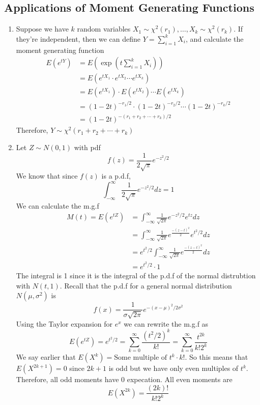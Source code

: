 \subsection{Applications of Moment Generating Functions}
\begin{enumerate}
    \item Suppose we have $k$ random variables $X_1 \sim \chi^2(r_1), \ldots, X_k \sim \chi^2(r_k)$.  If they're independent, then we can define $Y = \sum\limits_{i=1}^k X_i$, and calculate the moment generating function 
    \begin{align*}
        E(e^{tY}) &= E\left(\exp\left(t\sum_{i=1}^k X_i\right)\right)\\
        &= E(e^{tX_1} \cdot e^{tX_2} \cdots e^{tX_k})\\
        &= E(e^{tX_1}) \cdot E(e^{tX_2}) \cdots E(e^{tX_k})\\
        &= (1-2t)^{-r_1/2} \cdot (1-2t)^{-r_2/2} \cdots (1-2t)^{-r_k/2}\\
        &= (1-2t)^{-(r_1 + r_2 + \cdots + r_k)/2}
    \end{align*}
    Therefore, $Y \sim \chi^2(r_1 + r_2 + \cdots + r_k)$
    \item Let $Z \sim N(0,1)$ with pdf 
    \[f(z) = \frac{1}{2\sqrt{\pi}}e^{-z^2/2}\]
    We know that since $f(z)$ is a p.d.f,
    \[\int_{-\infty}^\infty \frac{1}{2\sqrt{\pi}}e^{-z^2/2}dz = 1\]
    We can calculate the m.g.f 
    \begin{align*}
        M(t) = E(e^{tZ}) &= \int_{-\infty}^\infty \frac{1}{\sqrt{2\pi}}e^{-z^2/2}e^{tz}dz\\
        &= \int_{-\infty}^\infty \frac{1}{\sqrt{2\pi}}e^{\frac{-(z-t)^2}{2}}e^{t^2/2}dz\\
        &= e^{t^2/2}\int_{-\infty}^\infty \frac{1}{\sqrt{2\pi}}e^{\frac{-(z-t)^2}{2}}dz\\
        &= e^{t^2/2} \cdot 1
    \end{align*} 
    The integral is 1 since it is the integral of the p.d.f of the normal distrubtion with $N(t, 1)$. Recall that the p.d.f for a general normal distribution $N(\mu, \sigma^2)$ is 
    \[f(x) = \frac{1}{\sigma\sqrt{2\pi}}e^{-(x-\mu)^2/2\sigma^2}\]
    Using the Taylor expansion for $e^x$ we can rewrite the m.g.f as 
    \[E(e^{tZ}) = e^{t^2/2} = \sum_{k=0}^\infty \frac{(t^2/2)^k}{k!} = \sum_{k=0}^\infty \frac{t^{2k}}{k!2^k}\]
    We say earlier that $E(X^k) = \text{Some multiple of $t^k$} \cdot k!$. So this means that $E(X^{2k+1}) = 0$ since $2k+1$ is odd but we have only even multiples of $t^k$. Therefore, all odd moments have 0 expecation. All even moments are 
    \[E(X^{2k}) = \frac{(2k)!}{k!2^k}\]
\end{enumerate}
